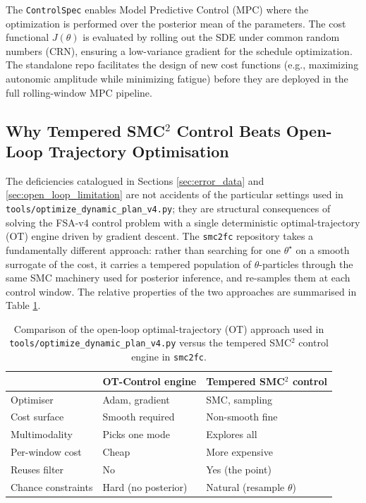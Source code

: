 The \texttt{ControlSpec} enables Model Predictive Control (MPC) where the optimization is performed over the posterior mean of the parameters. The cost functional $J(\theta)$ is evaluated by rolling out the SDE under common random numbers (CRN), ensuring a low-variance gradient for the schedule optimization. The standalone repo facilitates the design of new cost functions (e.g., maximizing autonomic amplitude while minimizing fatigue) before they are deployed in the full rolling-window MPC pipeline.

\subsection{Why Tempered SMC$^2$ Control Beats Open-Loop Trajectory Optimisation} \label{sec:smc2_vs_ot}

The deficiencies catalogued in Sections \ref{sec:error_data} and \ref{sec:open_loop_limitation} are not accidents of the particular settings used in \texttt{tools/optimize\_dynamic\_plan\_v4.py}; they are structural consequences of solving the FSA-v4 control problem with a single deterministic optimal-trajectory (OT) engine driven by gradient descent. The \texttt{smc2fc} repository takes a fundamentally different approach: rather than searching for one $\theta^\star$ on a smooth surrogate of the cost, it carries a tempered population of $\theta$-particles through the same SMC machinery used for posterior inference, and re-samples them at each control window. The relative properties of the two approaches are summarised in Table \ref{tab:ot_vs_smc2}.

\begin{table}[h]
    \centering
    \begin{tabular}{lll}
        \toprule
         & \textbf{OT-Control engine} & \textbf{Tempered SMC$^2$ control} \\
        \midrule
        Optimiser           & Adam, gradient          & SMC, sampling             \\
        Cost surface        & Smooth required         & Non-smooth fine           \\
        Multimodality       & Picks one mode          & Explores all              \\
        Per-window cost     & Cheap                   & More expensive            \\
        Reuses filter       & No                      & Yes (the point)           \\
        Chance constraints  & Hard (no posterior)     & Natural (resample $\theta$) \\
        \bottomrule
    \end{tabular}
    \caption{Comparison of the open-loop optimal-trajectory (OT) approach used in \texttt{tools/optimize\_dynamic\_plan\_v4.py} versus the tempered SMC$^2$ control engine in \texttt{smc2fc}.}
    \label{tab:ot_vs_smc2}
\end{table}

